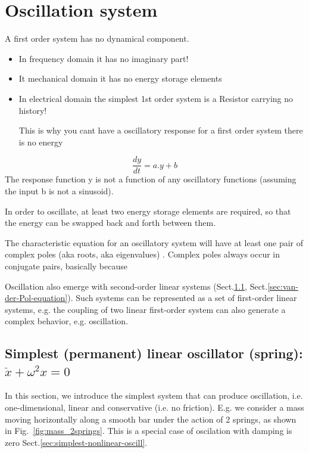 \section{Oscillation system}
\label{sec:oscillation-system}
\label{sec:biochemical-oscillation}

A first order system has no dynamical component.
\begin{itemize}
  \item  In frequency domain it has no imaginary part! 
  
  \item It mechanical domain it  has no energy storage elements 
  
  
  \item In electrical domain the simplest 1st order
  system is a Resistor carrying no history! 
  
  This is why you cant have a oscillatory response for a first order system
  there is no energy
\end{itemize}
\begin{equation}
\frac{dy}{dt} = a.y + b
\end{equation}
The response function y is not a function of any oscillatory functions (assuming
the input b is not a sinusoid).

In order to oscillate, at least two energy storage elements are required, so
that the energy can be swapped back and forth between them.

The characteristic equation for an oscillatory system will have at least one
pair of complex poles (aka roots, aka eigenvalues) .   Complex poles always
occur in conjugate pairs, basically because


Oscillation also emerge with second-order linear systems
(Sect.\ref{sec:simplest-linear-oscill}, Sect.\ref{sec:van-der-Pol-equation}).
Such systems can be represented as a set of first-order linear systems, e.g. the
coupling of two linear first-order system can also generate a complex behavior,
e.g. oscillation.

\subsection[Simplest (permanent) linear oscillator: spring]{Simplest
(permanent) linear oscillator (spring): $\ddot{x} + \omega^2 x = 0$}
\label{sec:simplest-linear-oscill}

In this section, we introduce the simplest system that can produce oscillation,
i.e. one-dimensional, linear and conservative (i.e. no
friction)\cite{andronow1949osci}.  E.g. we consider a mass moving horizontally
along a smooth bar under the action of 2 springs, as shown in
Fig.~\ref{fig:mass_2springs}.  This is a special case of oscilation with damping
is zero Sect.\ref{sec:simplest-nonlinear-oscill}.

